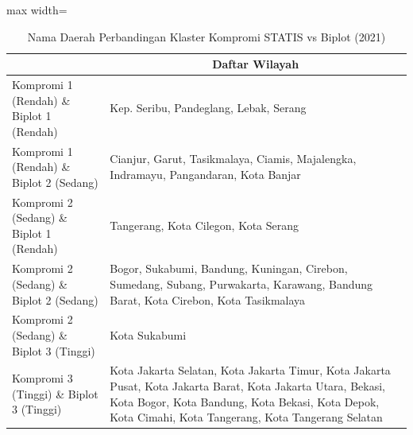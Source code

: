 \begin{table}[H]
\centering
\caption{Nama Daerah Perbandingan Klaster Kompromi STATIS vs Biplot (2021)} \label{tab:app2biplot_comp_name_2021}
\begin{adjustbox}{max width=\textwidth}
\begin{tabular}{|>{\centering\arraybackslash}p{4cm}|p{10cm}|}
\hline
\multicolumn{1}{|c|}{\textbf{Kategori}} & \multicolumn{1}{c|}{\textbf{Daftar Wilayah}} \\
\hline
Kompromi 1 (Rendah) \& Biplot 1 (Rendah) & Kep. Seribu, Pandeglang, Lebak, Serang \\
\hline
Kompromi 1 (Rendah) \& Biplot 2 (Sedang) & Cianjur, Garut, Tasikmalaya, Ciamis, Majalengka, Indramayu, Pangandaran, Kota Banjar \\
\hline
Kompromi 2 (Sedang) \& Biplot 1 (Rendah) & Tangerang, Kota Cilegon, Kota Serang \\
\hline
Kompromi 2 (Sedang) \& Biplot 2 (Sedang) & Bogor, Sukabumi, Bandung, Kuningan, Cirebon, Sumedang, Subang, Purwakarta, Karawang, Bandung Barat, Kota Cirebon, Kota Tasikmalaya \\
\hline
Kompromi 2 (Sedang) \& Biplot 3 (Tinggi) & Kota Sukabumi \\
\hline
Kompromi 3 (Tinggi) \& Biplot 3 (Tinggi) & Kota Jakarta Selatan, Kota Jakarta Timur, Kota Jakarta Pusat, Kota Jakarta Barat, Kota Jakarta Utara, Bekasi, Kota Bogor, Kota Bandung, Kota Bekasi, Kota Depok, Kota Cimahi, Kota Tangerang, Kota Tangerang Selatan \\
\hline
\end{tabular}
\end{adjustbox}
\end{table}